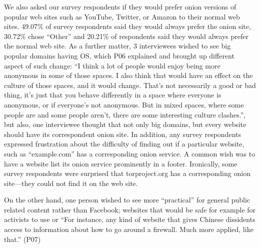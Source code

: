 We also asked our survey respondents if they would prefer onion versions of
popular web sites such as YouTube, Twitter, or Amazon to their normal web sites.
49.07\% of survey respondents said they would always prefer the onion site,
30.72\% chose ``Other'' and 20.21\% of respondents said they would always prefer
the normal web site. As a further matter, 3 interviewees wished to see big
popular domains having OS, which P06 explained and brought up different aspect
of such change: ``I think a lot of people would enjoy being more anonymous in
some of those spaces. I also think that would have an effect on the culture of
those spaces, and it would change. That's not necessarily a good or bad thing,
it's just that you behave differently in a space where everyone is anonymous, or
if everyone's not anonymous. But in mixed spaces, where some people are and some
people aren't, there are some interesting culture clashes.'', but also, one
interviewee thought that not only big domains, but every website should have its
correspondent onion site. In addition, any survey respondents expressed
frustration about the difficulty of finding out if a particular website, such as
``example.com'' has a corresponding onion service.  A common wish was to have a
website list its onion service prominently in a footer.  Ironically, some survey
respondents were surprised that torproject.org has a corresponding onion
site---they could not find it on the web site.

 On the other hand, one person wished to see more ``practical'' for general
 public related content rather than Facebook; websites that would be safe for
 example for activists to use or ``For instance, any kind of website that gives
 Chinese dissidents access to information about how to go around a firewall.
 Much more applied, like that.'' (P07)

